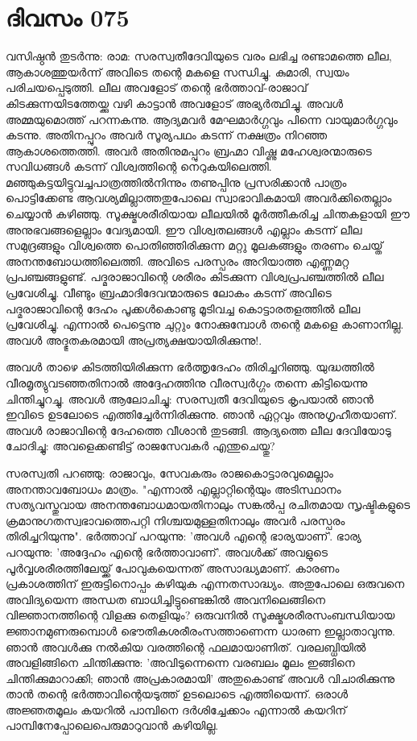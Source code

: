  
\section{ദിവസം 075}


വസിഷ്ഠന്‍ തുടര്‍ന്നു: രാമ: സരസ്വതീദേവിയുടെ വരം ലഭിച്ച രണ്ടാമത്തെ ലീല, ആകാശത്തുയര്‍ന്ന് അവിടെ തന്റെ മകളെ സന്ധിച്ചു. കുമാരി, സ്വയം പരിചയപ്പെടുത്തി. ലീല അവളോട്‌ തന്റെ ഭര്‍ത്താവ്‌-രാജാവ്‌ കിടക്കുന്നയിടത്തേയ്ക്കു വഴി കാട്ടാന്‍ അവളോട്‌ അഭ്യര്‍ത്ഥിച്ചു. അവള്‍ അമ്മയുമൊത്ത്‌ പറന്നകന്നു. ആദ്യമവര്‍ മേഘമാര്‍ഗ്ഗവും പിന്നെ വായുമാര്‍ഗ്ഗവും കടന്നു. അതിനപ്പുറം അവര്‍ സൂര്യപഥം കടന്ന് നക്ഷത്രം നിറഞ്ഞ ആകാശത്തെത്തി. അവര്‍ അതിനുമപ്പുറം ബ്രഹ്മാ വിഷ്ണു മഹേശ്വരന്മാരുടെ സവിധങ്ങള്‍ കടന്ന് വിശ്വത്തിന്റെ നെറുകയിലെത്തി. മഞ്ഞുകട്ടയിട്ടുവച്ചപാത്രത്തില്‍നിന്നും തണുപ്പിനു പ്രസരിക്കാന്‍ പാത്രം പൊട്ടിക്കേണ്ട ആവശ്യമില്ലാത്തതുപോലെ സ്വാഭാവികമായി അവര്‍ക്കിതെല്ലാം ചെയ്യാന്‍ കഴിഞ്ഞു. സൂക്ഷ്മശരീരിയായ ലീലയില്‍ മൂര്‍ത്തീകരിച്ച ചിന്തകളായി ഈ അനുഭവങ്ങളെല്ലാം വേദ്യമായി. ഈ വിശ്വതലങ്ങള്‍ എല്ലാം കടന്ന് ലീല സമുദ്രങ്ങളും വിശ്വത്തെ പൊതിഞ്ഞിരിക്കുന്ന മറ്റു മൂലകങ്ങളും തരണം ചെയ്ത്‌ അനന്തബോധത്തിലെത്തി. അവിടെ പരസ്പരം അറിയാത്ത എണ്ണമറ്റ പ്രപഞ്ചങ്ങളുണ്ട്‌. പദ്മരാജാവിന്റെ ശരീരം കിടക്കുന്ന വിശ്വപ്രപഞ്ചത്തില്‍ ലീല പ്രവേശിച്ചു. വീണ്ടും ബ്രഹ്മാദിദേവന്മാരുടെ ലോകം കടന്ന് അവിടെ പദ്മരാജാവിന്റെ ദേഹം പൂക്കള്‍കൊണ്ടു മൂടിവച്ച കൊട്ടാരതളത്തില്‍ ലീല പ്രവേശിച്ചു. എന്നാല്‍ പെട്ടെന്നു ചുറ്റും നോക്കുമ്പോള്‍ തന്റെ മകളെ കാണാനില്ല. അവള്‍ അദ്ഭുതകരമായി അപ്രത്യക്ഷയായിരിക്കുന്നു!. 

അവള്‍ താഴെ കിടത്തിയിരിക്കുന്ന ഭര്‍ത്തൃദേഹം തിരിച്ചറിഞ്ഞു. യുദ്ധത്തില്‍ വീരമൃത്യുവടഞ്ഞതിനാല്‍ അദ്ദേഹത്തിനു വീരസ്വര്‍ഗ്ഗം തന്നെ കിട്ടിയെന്നു ചിന്തിച്ചുറച്ചു. അവള്‍ ആലോചിച്ചു: സരസ്വതീ ദേവിയുടെ കൃപയാല്‍ ഞാന്‍ ഇവിടെ ഉടലോടെ എത്തിച്ചേര്‍ന്നിരിക്കുന്നു. ഞാന്‍ ഏറ്റവും അനുഗൃഹീതയാണ്‌. അവള്‍ രാജാവിന്റെ ദേഹത്തെ വീശാന്‍ തുടങ്ങി. ആദ്യത്തെ ലീല ദേവിയോടു ചോദിച്ചു: അവളെക്കണ്ടിട്ട്‌ രാജസേവകര്‍ എന്തുചെയ്തു?

സരസ്വതി പറഞ്ഞു: രാജാവും, സേവകരും രാജകൊട്ടാരവുമെല്ലാം അനന്താവബോധം മാത്രം. "എന്നാല്‍ എല്ലാറ്റിന്റെയും അടിസ്ഥാനം സത്യവസ്തുവായ അനന്തബോധമായതിനാലും സങ്കല്‍പ്പ രചിതമായ സൃഷ്ടികളുടെ ക്രമാനുഗതസ്വഭാവത്തെപറ്റി നിശ്ചയമുള്ളതിനാലും അവര്‍ പരസ്പരം തിരിച്ചറിയുന്നു". ഭര്‍ത്താവ്‌ പറയുന്നു: 'അവള്‍ എന്റെ ഭാര്യയാണ്‌'. ഭാര്യ പറയുന്നു: 'അദ്ദേഹം എന്റെ ഭര്‍ത്താവാണ്‌'. അവള്‍ക്ക്‌ അവളുടെ പൂര്‍വ്വശരീരത്തിലേയ്ക്ക്‌ പോവുകയെന്നത്‌ അസാദ്ധ്യമാണ്‌. കാരണം പ്രകാശത്തിന്‌ ഇരുട്ടിനൊപ്പം കഴിയുക എന്നതസാദ്ധ്യം. അതുപോലെ ഒരുവനെ അവിദ്യയെന്ന അന്ധത ബാധിച്ചിട്ടുണ്ടെങ്കില്‍ അവനിലെങ്ങിനെ വിജ്ഞാനത്തിന്റെ വിളക്കു തെളിയും? ഒരുവനില്‍ സൂക്ഷ്മശരീരസംബന്ധിയായ ജ്ഞാനമുണരുമ്പൊള്‍ ഭൌതികശരീരംസത്താണെന്ന ധാരണ ഇല്ലാതാവുന്നു. ഞാന്‍ അവള്‍ക്കു നല്‍കിയ വരത്തിന്റെ ഫലമായാണിത്‌. വരലബ്ധിയില്‍ അവളിങ്ങിനെ ചിന്തിക്കുന്നു: 'അവിടുന്നെന്നെ വരബലം മൂലം ഇങ്ങിനെ ചിന്തിക്കുമാറാക്കി; ഞാന്‍ അപ്രകാരമായി' അതുകൊണ്ട്‌ അവള്‍ വിചാരിക്കുന്നു താന്‍ തന്റെ ഭര്‍ത്താവിന്റെയടുത്ത്‌ ഉടലൊടെ എത്തിയെന്ന്. ഒരാള്‍ അജ്ഞതമൂലം കയറില്‍ പാമ്പിനെ ദര്‍ശിച്ചേക്കാം എന്നാല്‍ കയറിന്‌ പാമ്പിനേപ്പോലെപെരുമാറുവാന്‍ കഴിയില്ല. 


